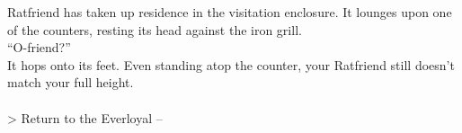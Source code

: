 Ratfriend has taken up residence in the visitation enclosure. It lounges upon one of the counters, resting its head against the iron grill.\\

“O-friend?”\\
It hops onto its feet. Even standing atop the counter, your Ratfriend still doesn’t match your full height.\\

\\
> Return to the Everloyal -- 